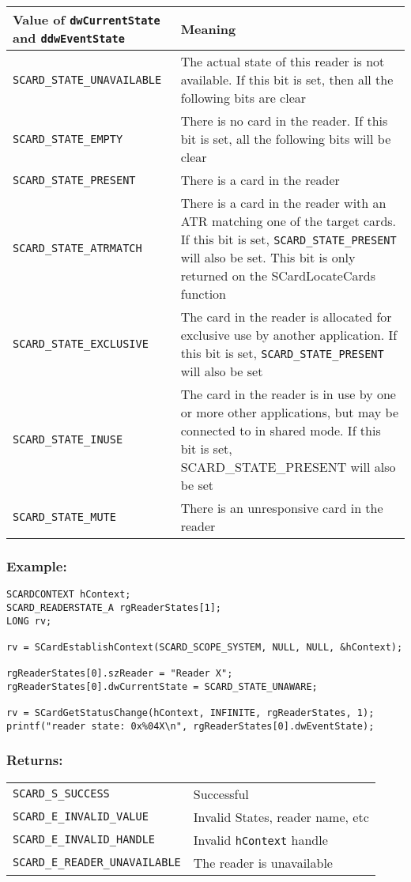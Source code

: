 \documentclass[a4paper,12pt]{article}
\newcommand{\example}{\subsubsection{Example:}}
\newcommand{\returns}{\subsubsection{Returns:}}
\begin{document}
\begin{tabular}{|p{5cm}|p{10.5cm}|}
\hline
Value of \texttt{dwCurrentState} and \texttt{ddwEventState} & Meaning \\
\hline
\hline
\texttt{SCARD\_STATE\_UNAVAILABLE} & The actual state of this reader is
not available. If this bit is set, then all the following bits are clear\\

\texttt{SCARD\_STATE\_EMPTY} & There is no card in the reader. If this
bit is set, all the following bits will be clear\\

\texttt{SCARD\_STATE\_PRESENT} & There is a card in the reader\\
\texttt{SCARD\_STATE\_ATRMATCH} & There is a card in the reader with an
ATR matching one of the target cards. If this bit is set,
\texttt{SCARD\_STATE\_PRESENT} will also be set. This bit is only
returned on the SCardLocateCards function\\

\texttt{SCARD\_STATE\_EXCLUSIVE} & The card in the reader is allocated
for exclusive use by another application. If this bit is set,
\texttt{SCARD\_STATE\_PRESENT} will also be set\\

\texttt{SCARD\_STATE\_INUSE} & The card in the reader is in use by one
or more other applications, but may be connected to in shared mode.  If
this bit is set, SCARD\_STATE\_PRESENT will also be set\\

\texttt{SCARD\_STATE\_MUTE} & There is an unresponsive card in the reader\\
\hline
\end{tabular}

\example

\begin{verbatim}
SCARDCONTEXT hContext;
SCARD_READERSTATE_A rgReaderStates[1];
LONG rv;

rv = SCardEstablishContext(SCARD_SCOPE_SYSTEM, NULL, NULL, &hContext);

rgReaderStates[0].szReader = "Reader X";
rgReaderStates[0].dwCurrentState = SCARD_STATE_UNAWARE;

rv = SCardGetStatusChange(hContext, INFINITE, rgReaderStates, 1);
printf("reader state: 0x%04X\n", rgReaderStates[0].dwEventState);
\end{verbatim}


\returns

\begin{tabular}{ll}
\texttt{SCARD\_S\_SUCCESS}			& Successful\\
\texttt{SCARD\_E\_INVALID\_VALUE}		& Invalid States, reader name, etc\\
\texttt{SCARD\_E\_INVALID\_HANDLE}		& Invalid \texttt{hContext} handle\\
\texttt{SCARD\_E\_READER\_UNAVAILABLE} 	& The reader is unavailable\\
\end{tabular}
\end{document}
